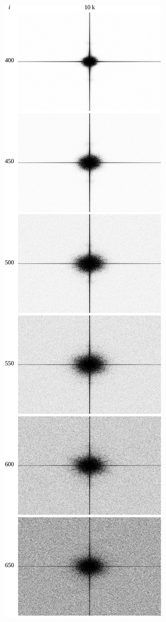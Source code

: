 \documentclass[aps,pre,12pt,preprint,%
	onecolumn,showpacs,showkeys,nofootinbib]{revtex4-1}
\begin{document}
\FloatBarrier\thispagestyle{empty}
	\begin{minipage}{\linewidth}
	\vspace{-3\baselineskip}\hspace{-6em}
	\begin{minipage}[c]{.625\linewidth}
	\includegraphics[height=.9\paperheight]{grid10k.pdf}

\end{minipage}
\end{minipage}
\end{document}
